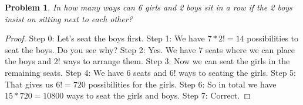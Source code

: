 \documentclass{article}
\newtheorem{theorem}{Problem}
\begin{document}
\begin{theorem}
In how many ways can 6 girls and 2 boys sit in a row if the 2 boys insist on sitting next to each other?
\end{theorem}

\begin{proof}
Step 0: Let's seat the boys first.
Step 1: We have $7*2!=14$ possibilities to seat the boys. Do you see why?
Step 2: Yes. We have 7 seats where we can place the boys and 2! ways to arrange them.
Step 3: Now we can seat the girls in the remaining seats.
Step 4: We have 6 seats and 6! ways to seating the girls.
Step 5: That gives us $6!=720$ possibilities for the girls.
Step 6: So in total we have $15*720=10800$ ways to seat the girls and boys.
Step 7: Correct.
\end{proof}
\end{document}
